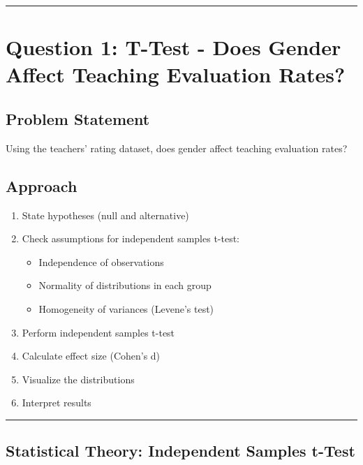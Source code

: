 \documentclass[11pt]{article}
\providecommand{\tightlist}{%
      \setlength{\itemsep}{0pt}\setlength{\parskip}{0pt}}
\begin{document}
    \begin{center}\rule{0.5\linewidth}{0.5pt}\end{center}

\section{Question 1: T-Test - Does Gender Affect Teaching Evaluation
Rates?}\label{question-1-t-test---does-gender-affect-teaching-evaluation-rates}

\subsection{Problem Statement}\label{problem-statement}

Using the teachers' rating dataset, does gender affect teaching
evaluation rates?

\subsection{Approach}\label{approach}

\begin{enumerate}
\def\labelenumi{\arabic{enumi}.}
\tightlist
\item
  State hypotheses (null and alternative)
\item
  Check assumptions for independent samples t-test:

  \begin{itemize}
  \tightlist
  \item
    Independence of observations
  \item
    Normality of distributions in each group
  \item
    Homogeneity of variances (Levene's test)
  \end{itemize}
\item
  Perform independent samples t-test
\item
  Calculate effect size (Cohen's d)
\item
  Visualize the distributions
\item
  Interpret results
\end{enumerate}

\begin{center}\rule{0.5\linewidth}{0.5pt}\end{center}

    \subsection{Statistical Theory: Independent Samples
t-Test}\label{statistical-theory-independent-samples-t-test}
\end{document}
